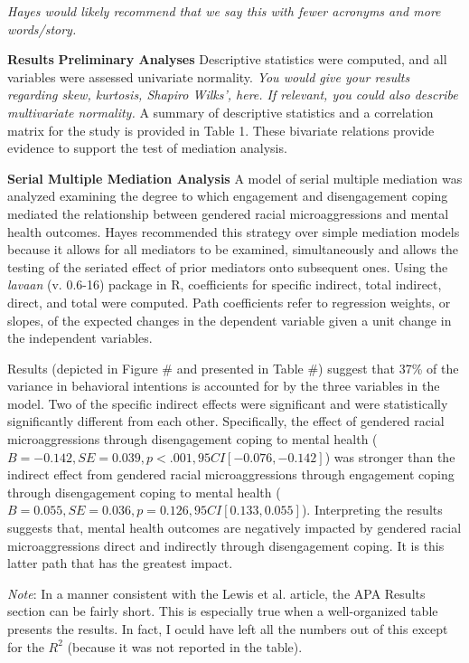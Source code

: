 \documentclass[
  11pt,
]{book}
\begin{document}
\emph{Hayes would likely recommend that we say this with fewer acronyms and more words/story.}

\textbf{Results} \textbf{Preliminary Analyses} Descriptive statistics were computed, and all variables were assessed univariate normality. \emph{You would give your results regarding skew, kurtosis, Shapiro Wilks', here. If relevant, you could also describe multivariate normality.} A summary of descriptive statistics and a correlation matrix for the study is provided in Table 1. These bivariate relations provide evidence to support the test of mediation analysis.

\textbf{Serial Multiple Mediation Analysis} A model of serial multiple mediation was analyzed examining the degree to which engagement and disengagement coping mediated the relationship between gendered racial microaggressions and mental health outcomes. Hayes \citeyearpar{hayes_more_2022} recommended this strategy over simple mediation models because it allows for all mediators to be examined, simultaneously and allows the testing of the seriated effect of prior mediators onto subsequent ones. Using the \emph{lavaan} (v. 0.6-16) package in R, coefficients for specific indirect, total indirect, direct, and total were computed. Path coefficients refer to regression weights, or slopes, of the expected changes in the dependent variable given a unit change in the independent variables.

Results (depicted in Figure \# and presented in Table \#) suggest that 37\% of the variance in behavioral intentions is accounted for by the three variables in the model. Two of the specific indirect effects were significant and were statistically significantly different from each other. Specifically, the effect of gendered racial microaggressions through disengagement coping to mental health (\(B= -0.142, SE = 0.039, p < .001, 95CI[-0.076, -0.142]\)) was stronger than the indirect effect from gendered racial microaggressions through engagement coping through disengagement coping to mental health (\(B = 0.055, SE = 0.036, p =0.126, 95CI [0.133, 0.055]\)). Interpreting the results suggests that, mental health outcomes are negatively impacted by gendered racial microaggressions direct and indirectly through disengagement coping. It is this latter path that has the greatest impact.

\emph{Note}: In a manner consistent with the Lewis et al. \citeyearpar{lewis_applying_2017} article, the APA Results section can be fairly short. This is especially true when a well-organized table presents the results. In fact, I oculd have left all the numbers out of this except for the \(R^2\) (because it was not reported in the table).
\end{document}
